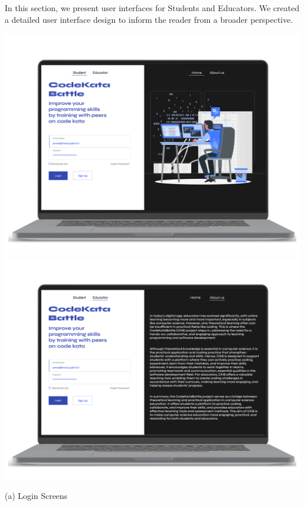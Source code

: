 In this section, we present user interfaces for Students and Educators. We created a detailed user interface design to inform the reader from a broader perspective. 
\begin{center}
    \includegraphics[scale=0.13]{Images/ui-ux/student_login.png}
    \includegraphics[scale=0.13]{Images/ui-ux/educator_login.png}
\end{center}
    \begin{center}
        (a) Login Screens
    \end{center}

